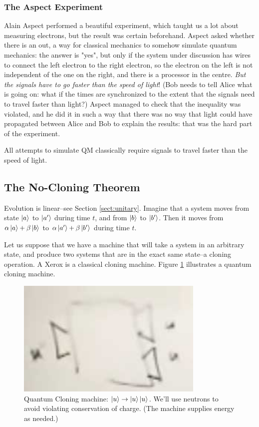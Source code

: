 \documentclass[]{article}
\begin{document}
\subsubsection{The Aspect Experiment}
Alain Aspect performed  a beautiful experiment\cite{aspect1982experimental}, which taught us a lot about measuring electrons, but the result was certain beforehand. Aspect asked whether there is an out, a way for classical mechanics to somehow simulate quantum mechanics: the answer is "yes", but only if the system under discussion has wires to connect the left electron to the right electron, so the electron on the left is not independent of the one on the right, and there is a processor in the centre. \emph{But the signals have to go faster than the speed of light}! (Bob needs to tell Alice what is going on: what if the times are synchronized to the extent that the signals need to travel faster than light?) Aspect managed to check that the inequality was violated, and he did it in such a way that there was no way that light could have propagated between Alice and Bob to explain the results: that was the hard part of the experiment.

All attempts to simulate QM classically require signals to travel faster than the speed of light.

\subsection{The No-Cloning Theorem}

Evolution is linear--see Section \ref{sect:unitary}. Imagine that a system moves from state $\ket{a}$ to $\ket{a^{\prime}}$ during time $t$, and from  $\ket{b}$ to $\ket{b^{\prime}}$. Then it moves from $\alpha \ket{a} + \beta \ket{b}$ to $\alpha \ket{a^{\prime}} + \beta \ket{b^{\prime}}$ during time $t$.

Let us suppose that we have a machine that will take a system in an arbitrary state, and produce two systems that are in the exact same state--a cloning operation. A Xerox is a classical cloning machine.  Figure \ref{fig:quantum:cloning:machine} illustrates a quantum cloning machine.

\begin{figure}[H]
	\caption[Quantum Cloning machine: $\ket{u}\rightarrow \ket{u}\ket{u}$]{Quantum Cloning machine: $\ket{u}\rightarrow \ket{u} \ket{u}$. We'll use neutrons to avoid violating conservation of charge. (The machine supplies energy as needed.)}\label{fig:quantum:cloning:machine}
	\includegraphics[width=0.8\textwidth]{quantum-cloning-machine}
\end{figure}
\end{document}
